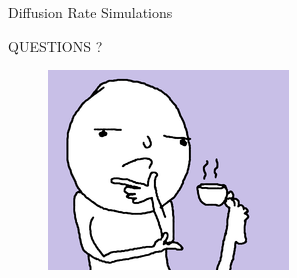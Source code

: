 \documentclass{beamer}
\begin{document}
\begin{frame}{Diffusion Rate Simulations}

%        

\end{frame}

\begin{frame}

\begin{center}
\LARGE{QUESTIONS ?}
\end{center}

\begin{figure}
        \centering
        \begin{minipage}{.5\textwidth}
            \centering
            \includegraphics[width=.8\linewidth]{questions.png}
        \end{minipage}%
        
\end{figure}

\end{frame}
\end{document}
